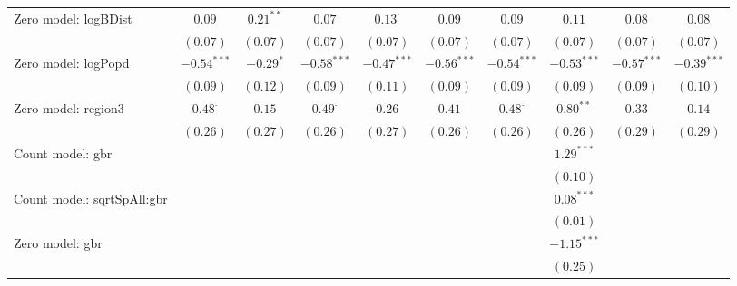 \begin{sidewaystable}
\begin{center}
{\begin{tabular}{l c c c c c c c c c}
Zero model: logBDist           & $0.09$         & $0.21^{**}$   & $0.07$         & $0.13^{\cdot}$  & $0.09$         & $0.09$         & $0.11$          & $0.08$          & $0.08$         \\
                               & $(0.07)$       & $(0.07)$      & $(0.07)$       & $(0.07)$        & $(0.07)$       & $(0.07)$       & $(0.07)$        & $(0.07)$        & $(0.07)$       \\
Zero model: logPopd            & $-0.54^{***}$  & $-0.29^{*}$   & $-0.58^{***}$  & $-0.47^{***}$   & $-0.56^{***}$  & $-0.54^{***}$  & $-0.53^{***}$   & $-0.57^{***}$   & $-0.39^{***}$  \\
                               & $(0.09)$       & $(0.12)$      & $(0.09)$       & $(0.11)$        & $(0.09)$       & $(0.09)$       & $(0.09)$        & $(0.09)$        & $(0.10)$       \\
Zero model: region3            & $0.48^{\cdot}$ & $0.15$        & $0.49^{\cdot}$ & $0.26$          & $0.41$         & $0.48^{\cdot}$ & $0.80^{**}$     & $0.33$          & $0.14$         \\
                               & $(0.26)$       & $(0.27)$      & $(0.26)$       & $(0.27)$        & $(0.26)$       & $(0.26)$       & $(0.26)$        & $(0.29)$        & $(0.29)$       \\
Count model: gbr               &                &               &                &                 &                &                & $1.29^{***}$    &                 &                \\
                               &                &               &                &                 &                &                & $(0.10)$        &                 &                \\
Count model: sqrtSpAll:gbr     &                &               &                &                 &                &                & $0.08^{***}$    &                 &                \\
                               &                &               &                &                 &                &                & $(0.01)$        &                 &                \\
Zero model: gbr                &                &               &                &                 &                &                & $-1.15^{***}$   &                 &                \\
                               &                &               &                &                 &                &                & $(0.25)$        &                 &                \\

\end{tabular}}
\end{center}
\end{sidewaystable}
